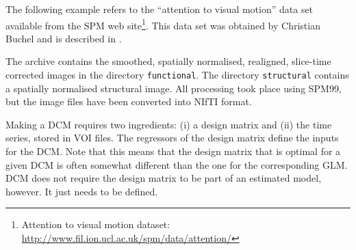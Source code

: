 The following example refers to the ``attention to visual motion'' data set available from the SPM web site\footnote{Attention to visual motion dataset: \url{http://www.fil.ion.ucl.ac.uk/spm/data/attention/}}. This data set was obtained by Christian Buchel and is described in \cite{buchel97}.

The archive contains the smoothed, spatially normalised, realigned, slice-time corrected images in the directory \texttt{functional}. The directory \texttt{structural} contains a spatially normalised structural image. All processing took place using SPM99, but the image files have been converted into NIfTI format.

Making a DCM requires two ingredients: (i) a design matrix and (ii) the time series, stored in VOI files.  The regressors of the design matrix define the inputs for the DCM.  Note that this means that the design matrix that is optimal for a given DCM is often somewhat different than the one for the corresponding GLM. DCM does not require the design matrix to be part of an estimated model, however. It just needs to be defined.

